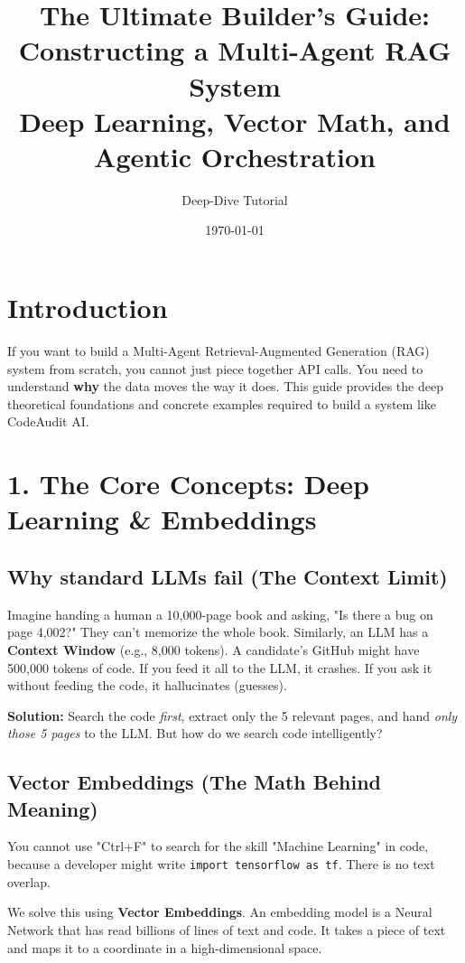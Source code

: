 \documentclass[12pt,a4paper]{article}
\title{\Huge \textbf{The Ultimate Builder's Guide: Constructing a Multi-Agent RAG System} \\ 
\Large Deep Learning, Vector Math, and Agentic Orchestration}
\author{Deep-Dive Tutorial}
\date{\today}
\begin{document}
\maketitle
\tableofcontents
\newpage

\section{Introduction}
If you want to build a Multi-Agent Retrieval-Augmented Generation (RAG) system from scratch, you cannot just piece together API calls. You need to understand \textbf{why} the data moves the way it does. This guide provides the deep theoretical foundations and concrete examples required to build a system like CodeAudit AI.

\section{1. The Core Concepts: Deep Learning \& Embeddings}

\subsection{Why standard LLMs fail (The Context Limit)}
Imagine handing a human a 10,000-page book and asking, "Is there a bug on page 4,002?" They can't memorize the whole book. Similarly, an LLM has a \textbf{Context Window} (e.g., 8,000 tokens). A candidate's GitHub might have 500,000 tokens of code. If you feed it all to the LLM, it crashes. If you ask it without feeding the code, it hallucinates (guesses).

\textbf{Solution:} Search the code \textit{first}, extract only the 5 relevant pages, and hand \textit{only those 5 pages} to the LLM. But how do we search code intelligently?

\subsection{Vector Embeddings (The Math Behind Meaning)}
You cannot use "Ctrl+F" to search for the skill "Machine Learning" in code, because a developer might write \texttt{import tensorflow as tf}. There is no text overlap. 

We solve this using \textbf{Vector Embeddings}. An embedding model is a Neural Network that has read billions of lines of text and code. It takes a piece of text and maps it to a coordinate in a high-dimensional space.
\end{document}
